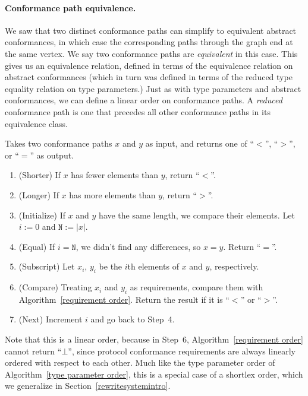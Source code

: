 \documentclass[../generics]{subfiles}
\begin{document}
\paragraph{Conformance path equivalence.}
We saw that two distinct conformance paths can simplify to equivalent abstract conformances, in which case the corresponding paths through the graph end at the same vertex. We say two conformance paths are \emph{equivalent} in this case. This gives us an equivalence relation, defined in terms of the equivalence relation on abstract conformances (which in turn was defined in terms of the reduced type equality relation on type parameters.) Just as with type parameters and abstract conformances, we can define a linear order on conformance paths. A \emph{reduced} conformance path is one that precedes all other conformance paths in its equivalence class.
\begin{algorithm}\label{conformance path order alg}
Takes two conformance paths $x$ and $y$ as input, and returns one of ``$<$'', ``$>$'', or ``$=$'' as output.
\begin{enumerate}
\item (Shorter) If $x$ has fewer elements than $y$, return ``$<$''.
\item (Longer) If $x$ has more elements than $y$, return ``$>$''.
\item (Initialize) If $x$ and $y$ have the same length, we compare their elements. Let $i:=0$ and $\texttt{N}:=|x|$.
\item (Equal) If $i=\texttt{N}$, we didn't find any differences, so $x=y$. Return ``$=$''.
\item (Subscript) Let $x_i$, $y_i$ be the $i$th elements of $x$ and $y$, respectively.
\item (Compare) Treating $x_i$ and $y_i$ as requirements, compare them with Algorithm~\ref{requirement order}. Return the result if it is ``$<$'' or ``$>$''.
\item (Next) Increment $i$ and go back to Step~4.
\end{enumerate}
\end{algorithm}
Note that this is a linear order, because in Step~6, Algorithm~\ref{requirement order} cannot return ``$\bot$'', since protocol conformance requirements are always linearly ordered with respect to each other. Much like the type parameter order of Algorithm~\ref{type parameter order}, this is a special case of a shortlex order, which we generalize in Section~\ref{rewritesystemintro}.
\end{document}
